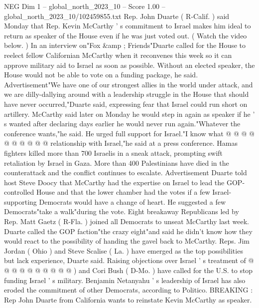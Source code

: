 \begin{textsample}{NEG Dim 1 – global\_north\_2023\_10 – Score 1.00 – global\_north\_2023\_10/102459855.txt}  \label{ex:f1_neg_134}
Rep.
John Duarte ( R-Calif. ) said Monday that Rep.
Kevin McCarthy ' s commitment to Israel makes him ideal to return as speaker of the House even if he was just voted out. ( Watch the video below. ) In an interview on"Fox \&amp ; Friends"Duarte called for the House to reelect fellow Californian McCarthy when it reconvenes this week so it can approve military aid to Israel as soon as possible.
Without an elected speaker, the House would not be able to vote on a funding package, he said.
Advertisement"We have one of our strongest allies in the world under attack, and we are dilly-dallying around with a leadership struggle in the House that should have never occurred,"Duarte said, expressing fear that Israel could run short on artillery.
McCarthy said later on Monday he would step in again as speaker if he ' s wanted after declaring days earlier he would never run again."Whatever the conference wants,"he said.
He urged full support for Israel."I know what @ @ @ @ @ @ @ @ @ @ relationship with Israel,"he said at a press conference.
Hamas fighters killed more than 700 Israelis in a sneak attack, prompting swift retaliation by Israel in Gaza.
More than 400 Palestinians have died in the counterattack and the conflict continues to escalate.
Advertisement Duarte told host Steve Doocy that McCarthy had the expertise on Israel to lead the GOP-controlled House and that the lower chamber had the votes if a few Israel-supporting Democrats would have a change of heart.
He suggested a few Democrats"take a walk"during the vote.
Eight breakaway Republicans led by Rep.
Matt Gaetz ( R-Fla. ) joined all Democrats to unseat McCarthy last week.
Duarte called the GOP faction"the crazy eight"and said he didn't know how they would react to the possibility of handing the gavel back to McCarthy.
Reps.
Jim Jordan ( Ohio ) and Steve Scalise ( La. ) have emerged as the top possibilities but lack experience, Duarte said.
Raising objections over Israel ' s treatment of @ @ @ @ @ @ @ @ @ @ ) and Cori Bush ( D-Mo. ) have called for the U.S. to stop funding Israel ' s military.
Benjamin Netanyahu ' s leadership of Israel has also eroded the commitment of other Democrats, according to Politico.
BREAKING : Rep John Duarte from California wants to reinstate Kevin McCarthy as speaker.

\end{textsample}
